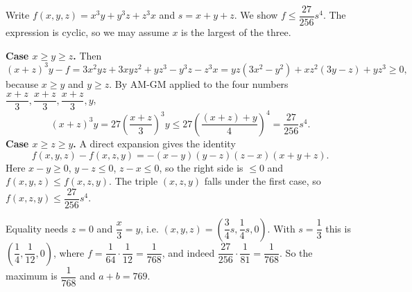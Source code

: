 Write $f(x,y,z)=x^3y+y^3z+z^3x$ and $s=x+y+z$. We show $f\le\dfrac{27}{256}s^4$. The expression is cyclic, so we may assume $x$ is the largest of the three.

\textbf{Case $x\ge y\ge z$.} Then
\[
(x+z)^3y-f=3x^2yz+3xyz^2+yz^3-y^3z-z^3x=yz\left(3x^2-y^2\right)+xz^2(3y-z)+yz^3\ge0,
\]
because $x\ge y$ and $y\ge z$. By AM-GM applied to the four numbers $\dfrac{x+z}{3},\dfrac{x+z}{3},\dfrac{x+z}{3},y$,
\[
(x+z)^3y=27\left(\dfrac{x+z}{3}\right)^3y\le27\left(\dfrac{(x+z)+y}{4}\right)^4=\dfrac{27}{256}s^4 .
\]
\textbf{Case $x\ge z\ge y$.} A direct expansion gives the identity
\[
f(x,y,z)-f(x,z,y)=-(x-y)(y-z)(z-x)(x+y+z).
\]
Here $x-y\ge0$, $y-z\le0$, $z-x\le0$, so the right side is $\le0$ and $f(x,y,z)\le f(x,z,y)$. The triple $(x,z,y)$ falls under the first case, so $f(x,z,y)\le\dfrac{27}{256}s^4$.

Equality needs $z=0$ and $\dfrac{x}{3}=y$, i.e. $(x,y,z)=\left(\dfrac{3}{4}s,\dfrac{1}{4}s,0\right)$. With $s=\dfrac{1}{3}$ this is $\left(\dfrac{1}{4},\dfrac{1}{12},0\right)$, where $f=\dfrac{1}{64}\cdot\dfrac{1}{12}=\dfrac{1}{768}$, and indeed $\dfrac{27}{256}\cdot\dfrac{1}{81}=\dfrac{1}{768}$. So the maximum is $\dfrac{1}{768}$ and $a+b=\boxed{769}$.
